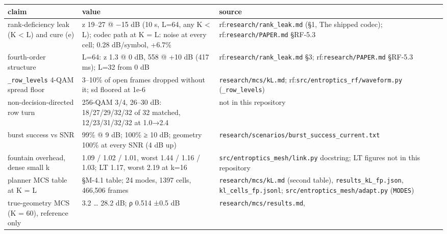 \documentclass[10pt,letterpaper,twocolumn]{article}
\begin{document}
\begin{table}[tp]
\centering\footnotesize
\begin{tabular}{L{0.175\textwidth}L{0.545\textwidth}L{0.230\textwidth}}
\toprule
claim & value & source \\
\midrule
rank-deficiency leak (K \textless{} L) and cure (e) & z 19--27 @ −15 dB (10 s, L=64, any K \textless{} L); codec path at K =
L: noise at every cell; 0.28 dB/symbol, +6.7\% & rf:\texttt{research/\allowbreak{}rank\_\allowbreak{}leak.\allowbreak{}md}
(§1, The shipped codec);
rf:\texttt{research/\allowbreak{}PAPER.\allowbreak{}md} §RF-5.3 \\
fourth-order structure & L=64: z 1.3 @ 0 dB, 558 @ +10 dB (417 ms); L=32 from 0 dB & rf:\texttt{research/\allowbreak{}rank\_\allowbreak{}leak.\allowbreak{}md}
§3; rf:\texttt{research/\allowbreak{}PAPER.\allowbreak{}md} §RF-5.3 \\
\texttt{\_\allowbreak{}row\_\allowbreak{}levels} 4-QAM spread floor & 3--10\% of open frames dropped without it; sd floored at 1e-6 & \texttt{research/\allowbreak{}mcs/\allowbreak{}kL.\allowbreak{}md};
rf:\texttt{src/\allowbreak{}entroptics\_\allowbreak{}rf/\allowbreak{}waveform.\allowbreak{}py}
(\texttt{\_\allowbreak{}row\_\allowbreak{}levels}) \\
non-decision-directed row turn & 256-QAM 3/4, 26--30 dB: 18/27/29/32/32 of 32 matched, 12/23/31/32/32 at
1.0→2.4 & not in this repository \\
burst success vs SNR & 99\% @ 9 dB; 100\% ≥ 10 dB; geometry 100\% at every SNR (4 dB up) & \texttt{research/\allowbreak{}scenarios/\allowbreak{}burst\_\allowbreak{}success\_\allowbreak{}current.\allowbreak{}txt} \\
fountain overhead, dense small k & 1.09 / 1.02 / 1.01, worst 1.44 / 1.16 / 1.03; LT 1.17, worst 2.19 at
k=16 & \texttt{src/\allowbreak{}entroptics\_\allowbreak{}mesh/\allowbreak{}link.\allowbreak{}py}
docstring; LT figures not in this repository \\
planner MCS table at K = L & §M-4.1 table; 24 modes, 1397 cells, 466,506 frames & \texttt{research/\allowbreak{}mcs/\allowbreak{}kL.\allowbreak{}md}
(second table),
\texttt{results\_\allowbreak{}kL\_\allowbreak{}fp.\allowbreak{}json},
\texttt{kl\_\allowbreak{}cells\_\allowbreak{}fp.\allowbreak{}jsonl};
\texttt{src/\allowbreak{}entroptics\_\allowbreak{}mesh/\allowbreak{}adapt.\allowbreak{}py}
(\texttt{MODES}) \\
true-geometry MCS (K = 60), reference only & 3.2 \ldots{} 28.2 dB; ρ 0.514 ±0.5 dB & \texttt{research/\allowbreak{}mcs/\allowbreak{}results.\allowbreak{}md},

\end{tabular}
\end{table}
\end{document}
